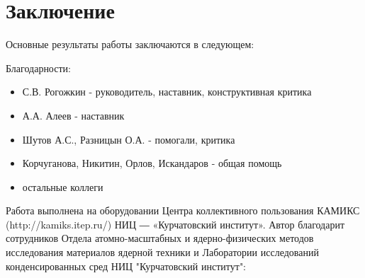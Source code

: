 \chapter*{Заключение}                       %


Основные результаты работы заключаются в следующем:

\clearpage
Благодарности:
\begin{itemize}
	\item С.В. Рогожкин - руководитель, наставник, конструктивная критика
	\item А.А. Алеев - наставник
	\item Шутов А.С., Разницын О.А. - помогали, критика
	\item Корчуганова, Никитин, Орлов, Искандаров - общая помощь
	\item остальные коллеги
\end{itemize}
Работа выполнена на оборудовании Центра коллективного пользования КАМИКС (http://kamiks.itep.ru/) НИЦ ― «Курчатовский институт».
Автор благодарит сотрудников Отдела атомно-масштабных и ядерно-физических методов исследования материалов ядерной техники и Лаборатории исследований конденсированных сред НИЦ "Курчатовский институт":




